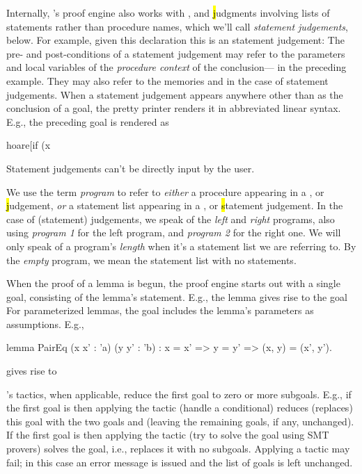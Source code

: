 Internally, \EasyCrypt's proof engine also works with \prhl, \phl and
\hl judgments involving lists of statements rather than procedure
names, which we'll call \emph{statement judgements}, below. For
example, given this declaration
 this is an \phl
statement judgement:
 The pre- and
post-conditions of a statement judgement may refer to the parameters
and local variables of the \emph{procedure context} of the
conclusion--- in the preceding example. They may also refer
to the memories  and  in the case of \prhl statement
judgements.  When a statement judgement appears anywhere other than as
the conclusion of a goal, the pretty printer renders it in abbreviated
linear syntax.  E.g., the preceding goal is rendered as
\begin{easycrypt}{}{}
hoare[if (x %
\end{easycrypt}
Statement judgements can't be directly input by the user.

We use the term \emph{program} to refer to \emph{either} a procedure
appearing in a \prhl, \phl or \hl judgement, \emph{or} a statement
list appearing in a \prhl, \phl or \hl statement judgement. In the
case of \prhl (statement) judgements, we speak of the \emph{left} and
\emph{right} programs, also using \emph{program 1} for the left
program, and \emph{program 2} for the right one. We will only speak of
a program's \emph{length} when it's a statement list we are referring
to. By the \emph{empty} program, we mean the statement list with no
statements.

When the proof of a lemma is begun, the proof engine starts out with
a single goal, consisting of the lemma's statement. E.g.,
the lemma
gives rise to the goal
For parameterized lemmas, the goal includes the lemma's parameters
as assumptions. E.g.,
\begin{easycrypt}{}{}
lemma PairEq (x x' : 'a) (y y' : 'b) :
  x = x' => y = y' => (x, y) = (x', y').
\end{easycrypt}
gives rise to

\EasyCrypt's tactics, when applicable, reduce the first goal to zero
or more subgoals.  E.g., if the first goal is
then applying the  tactic (handle a conditional) reduces
(replaces) this goal with the two goals
 and
(leaving the remaining goals, if any, unchanged).
If the first goal is
then applying the  tactic (try to solve the goal using
SMT provers) solves the goal, i.e., replaces it with no subgoals.
Applying a tactic may fail; in this case an error message is issued
and the list of goals is left unchanged.

